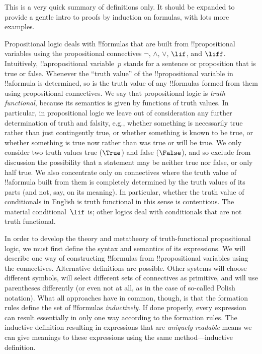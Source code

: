 
\begin{editorial}
  This is a very quick summary of definitions only. It should be
  expanded to provide a gentle intro to proofs by induction on
  formulas, with lots more examples.
\end{editorial}





Propositional logic deals with !!{formula}s that are built from
!!{propositional variable}s using the propositional connectives
$\lnot$, $\land$, $\lor$, $\lif$, and $\liff$.  Intuitively,
!!a{propositional variable}~$p$ stands for a sentence or proposition
that is true or false. Whenever the ``truth value'' of the
!!{propositional variable} in !!a{formula} is determined, so is the
truth value of any !!{formula}s formed from them using propositional
connectives.  We say that propositional logic is \emph{truth
  functional}, because its semantics is given by functions of truth
values. In particular, in propositional logic we leave out of
consideration any further determination of truth and falsity, e.g.,
whether something is necessarily true rather than just contingently
true, or whether something is known to be true, or whether something
is true now rather than was true or will be true.  We only consider
two truth values true ($\True$) and false ($\False$), and so exclude
from discussion the possibility that a statement may be neither true
nor false, or only half true. We also concentrate only on connectives where
the truth value of !!a{formula} built from them is completely
determined by the truth values of its parts (and not, say, on its
meaning). In particular, whether the truth value of conditionals in
English is truth functional in this sense is contentious. The material
conditional~$\lif$ is; other logics deal with conditionals that are
not truth functional.

In order to develop the theory and metatheory of truth-functional
propositional logic, we must first define the syntax and semantics of
its expressions.  We will describe one way of constructing
!!{formula}s from !!{propositional variable}s using the connectives.
Alternative definitions are possible. Other systems will choose
different symbols, will select different sets of connectives as
primitive, and will use parentheses differently (or even not at all,
as in the case of so-called Polish notation).  What all approaches
have in common, though, is that the formation rules define the set of
!!{formula}s \emph{inductively}. If done properly, every expression
can result essentially in only one way according to the formation
rules.  The inductive definition resulting in expressions that are
\emph{uniquely readable} means we can give meanings to these
expressions using the same method---inductive definition.

